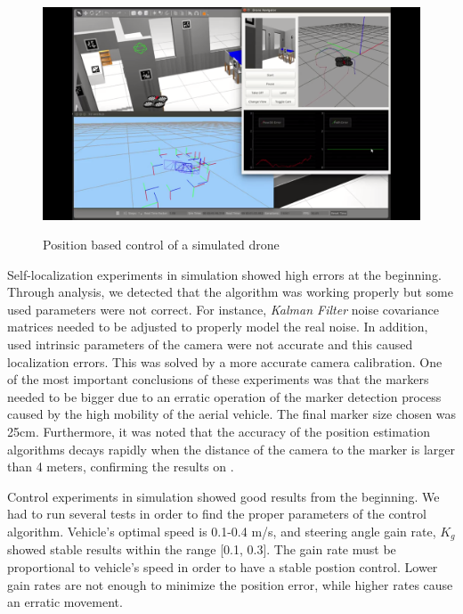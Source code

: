 \documentclass{styles/svproc}
\begin{document}
	\begin{figure}[h!]
          \begin{center}
            {\includegraphics[width=12cm]{simnavigation.png}}
          \end{center}
          \label{fig:simnavigation}
          \caption{Position based control of a simulated drone}
	\end{figure}
        
        Self-localization experiments in simulation showed high errors at the beginning. Through analysis, we detected that the algorithm was working properly but some used parameters were not correct. For instance, \textit{Kalman Filter} noise covariance matrices needed to be adjusted to properly model the real noise. In addition, used intrinsic parameters of the camera were not accurate and this caused localization errors. This was solved by a more accurate camera calibration. One of the most important conclusions of these experiments was that the markers needed to be bigger due to an erratic operation of the marker detection process caused by the high mobility of the aerial vehicle. The final marker size chosen was 25cm. Furthermore, it was noted that the accuracy of the position estimation algorithms decays rapidly when the distance of the camera to the marker is larger than 4 meters, confirming the results on \cite{lopezceron2016}.
	
	Control experiments in simulation showed good results from the beginning. We had to run several tests in order to find the proper parameters of the control algorithm. Vehicle's optimal speed is 0.1-0.4 m/s, and steering angle gain rate, $ K_{g}$ showed stable results within the range [0.1, 0.3]. The gain rate must be proportional to vehicle's speed in order to have a stable postion control. Lower gain rates are not enough to minimize the position error, while higher rates cause an erratic movement.
	
\end{document}
